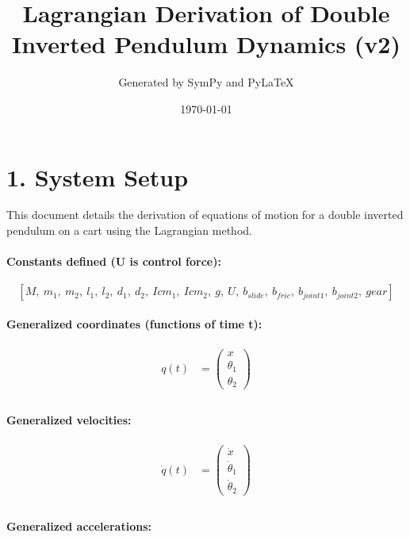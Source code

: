 \documentclass{article}%
\title{Lagrangian Derivation of Double Inverted Pendulum Dynamics (v2)}%
\author{Generated by SymPy and PyLaTeX}%
\date{\today}%
\begin{document}
%
\normalsize%
\maketitle%
\tableofcontents%
\newpage%
\section{1. System Setup}%
\label{sec:1.SystemSetup}%
This document details the derivation of equations of motion for a double inverted pendulum on a cart using the Lagrangian method.\newline%
%
\paragraph{Constants defined (U is control force):}%
\label{para:Constantsdefined(Uiscontrolforce)}%

%
\[%
\displaystyle \left[ M, \  m_{1}, \  m_{2}, \  l_{1}, \  l_{2}, \  d_{1}, \  d_{2}, \  Icm_{1}, \  Icm_{2}, \  g, \  U, \  b_{slide}, \  b_{fric}, \  b_{joint1}, \  b_{joint2}, \  gear\right]%
\]%
\paragraph{Generalized coordinates (functions of time t):}%
\label{para:Generalizedcoordinates(functionsoftimet)}%

%
\begin{align*}%
q(t) &= \displaystyle \begin{pmatrix}x\\\theta_1\\\theta_2\end{pmatrix} \\%
\end{align*}%
\paragraph{Generalized velocities:}%
\label{para:Generalizedvelocities}%

%
\begin{align*}%
\dot{q}(t) &= \displaystyle \begin{pmatrix}\dot{x}\\\dot{\theta}_{1}\\\dot{\theta}_{2}\end{pmatrix} \\%
\end{align*}%
\paragraph{Generalized accelerations:}%
\label{para:Generalizedaccelerations}%
\end{document}
